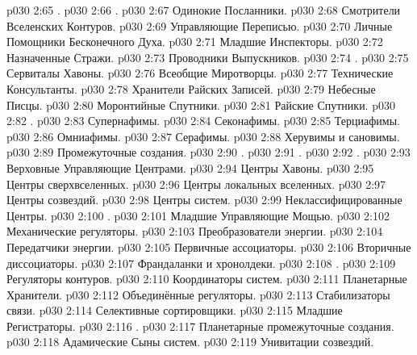 \vs p030 2:65 .
\vs p030 2:66 .
\vs p030 2:67 Одинокие Посланники.
\vs p030 2:68 Смотрители Вселенских Контуров.
\vs p030 2:69 Управляющие Переписью.
\vs p030 2:70 Личные Помощники Бесконечного Духа.
\vs p030 2:71 Младшие Инспекторы.
\vs p030 2:72 Назначенные Стражи.
\vs p030 2:73 Проводники Выпускников.
\vs p030 2:74 .
\vs p030 2:75 Сервиталы Хавоны.
\vs p030 2:76 Всеобщие Миротворцы.
\vs p030 2:77 Технические Консультанты.
\vs p030 2:78 Хранители Райских Записей.
\vs p030 2:79 Небесные Писцы.
\vs p030 2:80 Моронтийные Спутники.
\vs p030 2:81 Райские Спутники.
\vs p030 2:82 .
\vs p030 2:83 Супернафимы.
\vs p030 2:84 Секонафимы.
\vs p030 2:85 Терциафимы.
\vs p030 2:86 Омниафимы.
\vs p030 2:87 Серафимы.
\vs p030 2:88 Херувимы и сановимы.
\vs p030 2:89 Промежуточные создания.
\vs p030 2:90 .
\vs p030 2:91 .
\vs p030 2:92 .
\vs p030 2:93 Верховные Управляющие Центрами.
\vs p030 2:94 Центры Хавоны.
\vs p030 2:95 Центры сверхвселенных.
\vs p030 2:96 Центры локальных вселенных.
\vs p030 2:97 Центры созвездий.
\vs p030 2:98 Центры систем.
\vs p030 2:99 Неклассифицированные Центры.
\vs p030 2:100 .
\vs p030 2:101 Младшие Управляющие Мощью.
\vs p030 2:102 Механические регуляторы.
\vs p030 2:103 Преобразователи энергии.
\vs p030 2:104 Передатчики энергии.
\vs p030 2:105 Первичные ассоциаторы.
\vs p030 2:106 Вторичные диссоциаторы.
\vs p030 2:107 Франдаланки и хронолдеки.
\vs p030 2:108 .
\vs p030 2:109 Регуляторы контуров.
\vs p030 2:110 Координаторы систем.
\vs p030 2:111 Планетарные Хранители.
\vs p030 2:112 Объединённые регуляторы.
\vs p030 2:113 Стабилизаторы связи.
\vs p030 2:114 Селективные сортировщики.
\vs p030 2:115 Младшие Регистраторы.
\vs p030 2:116 .
\vs p030 2:117 Планетарные промежуточные создания.
\vs p030 2:118 Адамические Сыны систем.
\vs p030 2:119 Унивитации созвездий.
